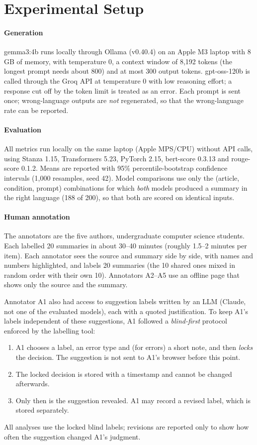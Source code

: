 \section{Experimental Setup}
\label{sec:setup}

\paragraph{Generation}
gemma3:4b runs locally through Ollama (v0.40.4) on an Apple M3 laptop with 8\,GB of memory, with temperature 0, a context window of 8,192 tokens (the longest prompt needs about 800) and at most 300 output tokens. gpt-oss-120b is called through the Groq API at temperature 0 with low reasoning effort; a response cut off by the token limit is treated as an error. Each prompt is sent once; wrong-language outputs are \emph{not} regenerated, so that the wrong-language rate can be reported.

\paragraph{Evaluation}
All metrics run locally on the same laptop (Apple MPS/CPU) without API calls, using Stanza 1.15, Transformers 5.23, PyTorch 2.15, bert-score 0.3.13 and rouge-score 0.1.2. Means are reported with 95\% percentile-bootstrap confidence intervals (1,000 resamples, seed 42). Model comparisons use only the (article, condition, prompt) combinations for which \emph{both} models produced a summary in the right language (188 of 200), so that both are scored on identical inputs.

\paragraph{Human annotation}
The annotators are the five authors, undergraduate computer science students. Each labelled 20 summaries in about 30--40 minutes (roughly 1.5--2 minutes per item). Each annotator sees the source and summary side by side, with names and numbers highlighted, and labels 20 summaries (the 10 shared ones mixed in random order with their own 10). Annotators A2--A5 use an offline page that shows only the source and the summary.

Annotator A1 also had access to suggestion labels written by an LLM (Claude, not one of the evaluated models), each with a quoted justification. To keep A1's labels independent of these suggestions, A1 followed a \emph{blind-first} protocol enforced by the labelling tool:
\begin{enumerate}
  \item A1 chooses a label, an error type and (for errors) a short note, and then \emph{locks} the decision. The suggestion is not sent to A1's browser before this point.
  \item The locked decision is stored with a timestamp and cannot be changed afterwards.
  \item Only then is the suggestion revealed. A1 may record a revised label, which is stored separately.
\end{enumerate}
All analyses use the locked blind labels; revisions are reported only to show how often the suggestion changed A1's judgment.

